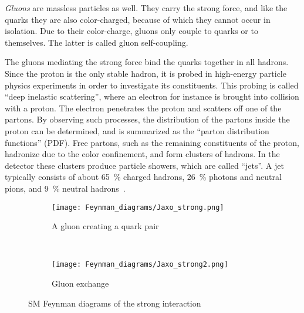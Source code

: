 \begin{minipage}{0.55\textwidth}
\textit{Gluons} are massless particles as well.
They carry the strong force, and like the quarks they are also color-charged, because of which they cannot occur in isolation.
Due to their color-charge, gluons only couple to quarks or to themselves.
The latter is called gluon self-coupling.

The gluons mediating the strong force bind the quarks together in all hadrons.
Since the proton is the only stable hadron, it is probed in high-energy particle physics experiments in order to investigate its constituents.
This probing is called ``deep inelastic scattering'', where an electron for instance is brought into collision with a proton.
The electron penetrates the proton and scatters off one of the partons.
By observing such processes, the distribution of the partons inside the proton can be determined, and is summarized as the ``parton distribution functions'' (PDF).
Free partons, such as the remaining constituents of the proton, hadronize due to the color confinement, and form clusters of hadrons.
In the detector these clusters produce particle showers, which are called ``jets''.
A jet typically consists of about \SI{65}{\percent} charged hadrons, \SI{26}{\percent} photons and neutral pions, and \SI{9}{\percent} neutral hadrons~\cite[p. 2]{PFA}.
\end{minipage} \hfill
\begin{minipage}{0.4\textwidth}
\centering
\begin{figure}[H]\centering
\begin{subfigure}[b]{\textwidth}\centering
\texttt{[image: Feynman\_diagrams/Jaxo\_strong.png]}
\caption{A gluon creating a quark pair}
\end{subfigure}\\
\begin{subfigure}[b]{\textwidth}\centering
 \texttt{[image: Feynman\_diagrams/Jaxo\_strong2.png]}
\caption{Gluon exchange}
\end{subfigure}
\caption{SM Feynman diagrams of the strong interaction}
\label{fig:Feynman:strong} 
\end{figure}
\end{minipage}

